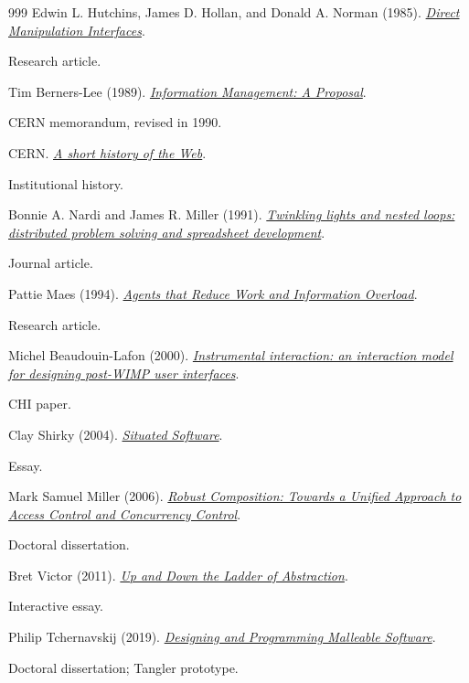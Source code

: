 \documentclass[11pt,letterpaper]{article}
\begin{document}
\begin{thebibliography}{999}
Edwin L. Hutchins, James D. Hollan, and Donald A. Norman (1985).
\href{https://doi.org/10.1207/s15327051hci0104_2}{\emph{Direct Manipulation Interfaces}}.
\par {\small Research article.}

Tim Berners-Lee (1989).
\href{https://www.w3.org/History/1989/proposal-msw.html}{\emph{Information Management: A Proposal}}.
\par {\small CERN memorandum, revised in 1990.}

CERN.
\href{https://home.cern/science/computing/the-birth-of-the-web/short-history-web/}{\emph{A short history of the Web}}.
\par {\small Institutional history.}

Bonnie A. Nardi and James R. Miller (1991).
\href{https://www.lri.fr/~mbl/Stanford/CS477/papers/Nardi-Twinkling-IJMMS.pdf}{\emph{Twinkling lights and nested loops: distributed problem solving and spreadsheet development}}.
\par {\small Journal article.}

Pattie Maes (1994).
\href{https://doi.org/10.1145/176789.176792}{\emph{Agents that Reduce Work and Information Overload}}.
\par {\small Research article.}

Michel Beaudouin-Lafon (2000).
\href{https://doi.org/10.1145/332040.332473}{\emph{Instrumental interaction: an interaction model for designing post-WIMP user interfaces}}.
\par {\small CHI paper.}

Clay Shirky (2004).
\href{https://gwern.net/doc/technology/2004-03-30-shirky-situatedsoftware.html}{\emph{Situated Software}}.
\par {\small Essay.}

Mark Samuel Miller (2006).
\href{https://www.erights.org/talks/thesis/index.html}{\emph{Robust Composition: Towards a Unified Approach to Access Control and Concurrency Control}}.
\par {\small Doctoral dissertation.}

Bret Victor (2011).
\href{https://worrydream.com/LadderOfAbstraction/}{\emph{Up and Down the Ladder of Abstraction}}.
\par {\small Interactive essay.}

Philip Tchernavskij (2019).
\href{https://theses.hal.science/tel-02612943v1}{\emph{Designing and Programming Malleable Software}}.
\par {\small Doctoral dissertation; Tangler prototype.}


\end{thebibliography}
\end{document}
